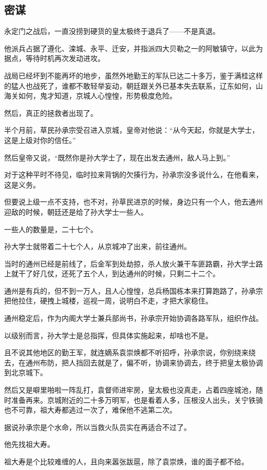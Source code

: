 \begin{multicols}{\theparacolNo}
		\subsection{密谋}
		永定门之战后，一直没捞到硬货的皇太极终于退兵了——不是真退。

		他派兵占据了遵化、滦城、永平、迁安，并指派四大贝勒之一的阿敏镇守，以此为据点，等待时机再次发动进攻。

		战局已经坏到不能再坏的地步，虽然外地勤王的军队已达二十多万，鉴于满桂这样的猛人也战死了，谁都不敢轻举妄动，朝廷跟关外已基本失去联系，辽东如何，山海关如何，鬼才知道，京城人心惶惶，形势极度危险。

		然后，真正的拯救者出现了。

		半个月前，草民孙承宗受召进入京城，皇帝对他说：“从今天起，你就是大学士，这是上级对你的信任。”

		然后皇帝又说，“既然你是孙大学士了，现在出发去通州，敌人马上到。”

		对于这种平时不待见，临时拉来背锅的欠揍行为，孙承宗没多说什么，在他看来，这是义务。

		但要说上级一点不支持，也不对，孙草民进京的时候，身边只有一个人，他去通州迎敌的时候，朝廷还是给了孙大学士一些人。

		一些人的数量是，二十七个。

		孙大学士就带着二十七个人，从京城冲了出来，前往通州。

		当时的通州已经是前线了，后金军到处劫掠，杀人放火兼干车匪路霸，孙大学士路上就干了好几仗，还死了五个人，到达通州的时候，只剩二十二个。

		通州是有兵的，但不到一万人，且人心惶惶，总兵杨国栋本来打算跑路了，孙承宗把他拉住，硬拽上城楼，巡视一周，说明白不走，才把大家稳住。

		通州稳定后，作为内阁大学士兼兵部尚书，孙承宗开始协调各路军队，组织作战。

		以级别而言，孙大学士是总指挥，但具体实施起来，却啥也不是。

		且不说其他地区的勤王军，就连嫡系袁崇焕都不听招呼，孙承宗说，你别绕来绕去，在通州布防，把人挡回去就是了，偏不听，协调来协调去，终于把皇太极协调到北京城下。

		然后又是噼里啪啦一阵乱打，袁督师进牢房，皇太极也没真走，占着四座城池，随时准备再来。京城附近的二十多万明军，也是看着人多，压根没人出头，关宁铁骑也不可靠，祖大寿都逃过一次了，难保他不逃第二次。

		据说孙承宗是个水命，所以当救火队员实在再适合不过了。

		他先找祖大寿。

		祖大寿是个比较难缠的人，且向来嚣张跋扈，除了袁崇焕，谁的面子都不给。


\end{multicols}
